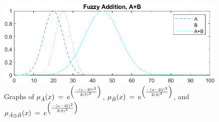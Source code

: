 \documentclass{article}
\begin{document}
\begin{figure}[h!]
    \centering
    \includegraphics[scale=1]{addition.png}
    \caption{\label{fig:add_img} Graphs of $\mu_{\Tilde{A}}(x) \:=\:e^{\left( \frac{-(x-20)^2}{2(5)^{2}} \right)}$, $\mu_{\Tilde{B}}(x) \:=\:e^{\left( \frac{-(x-25)^2}{2(4)^{2}} \right)}$, and $\mu_{\Tilde{A}\oplus\Tilde{B}}(x) \:=\:e^{\left( \frac{-(x-45)^2}{2(9)^{2}}\right)}$}
    \label{fig:add_img}
\end{figure}
\end{document}
